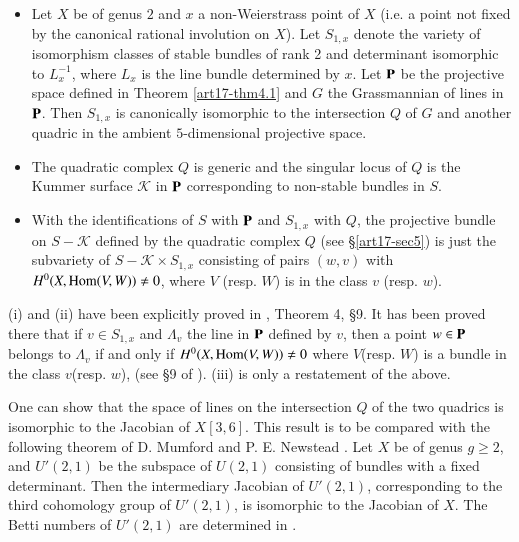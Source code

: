 \begin{theorem}\label{art17-thm6.1}
\begin{itemize}
\item[\rm(i)] Let $X$ be of genus $2$ and $x$ a non-Weierstrass point of $X$ (i.e. a point not fixed by the canonical rational involution on $X$). Let $S_{1,x}$ denote the variety of isomorphism classes of stable bundles of rank 2 and determinant isomorphic to $L^{-1}_{x}$, where $L_{x}$ is the line bundle determined by $x$. Let $\mathbf{P}$ be the projective space defined in Theorem \ref{art17-thm4.1} and $G$ the Grassmannian of lines in $\mathbf{P}$. Then $S_{1,x}$ is canonically isomorphic to the intersection $Q$ of $G$ and another quadric in the ambient $5$-dimensional projective space.

\item[\rm(ii)] The quadratic complex $Q$ is generic and the singular locus of $Q$ is the Kummer surface $\mathscr{K}$ in $\mathbf{P}$ corresponding to non-stable bundles in $S$.

\item[\rm(iii)] With the identifications of $S$ with $\mathbf{P}$ and $S_{1,x}$ with $Q$, the projective bundle on $S-\mathscr{K}$ defined by the quadratic complex $Q$ (see \S\ref{art17-sec5}) is just the subvariety of $S-\mathscr{K}\times S_{1,x}$ consisting of pairs $(w,v)$ with $H^{0}(X,\operatorname{\mathrm{Hom}}(V,W))\neq 0$, where $V$ (resp. $W$) is in the class $v$ (resp. $w$).
\end{itemize}
\end{theorem}

(i) and (ii) have been explicitly proved in \cite{art17-key3}, Theorem 4, \S9. It has been proved there that if $v\in S_{1,x}$ and $\Lambda_{v}$ the line in $\mathbf{P}$ defined by $v$, then a point $w\in \mathbf{P}$ belongs to $\Lambda_{v}$ if and only if $H^{0}(X,\operatorname{\mathrm{Hom}}(V,W))\neq 0$ where $V$(resp. $W$) is a bundle in the class $v$(resp. $w$), (see \S9 of \cite{art17-key3}). (iii) is only a restatement of the above.

\begin{remark*}
One can show that the space of lines on the intersection $Q$ of the two quadrics is isomorphic to the Jacobian of $X[3,6]$. This result is to be compared with the following theorem of D. Mumford and P. E. Newstead \cite{art17-key2}. Let $X$ be of genus $g\geq 2$, and $U'(2,1)$ be the subspace of $U(2,1)$ consisting of bundles with a fixed determinant. Then the intermediary Jacobian of $U'(2,1)$, corresponding to the third cohomology group of $U'(2,1)$, is isomorphic to the Jacobian of $X$. The Betti numbers of $U'(2,1)$ are determined in \cite{art17-key5}.
\end{remark*}

